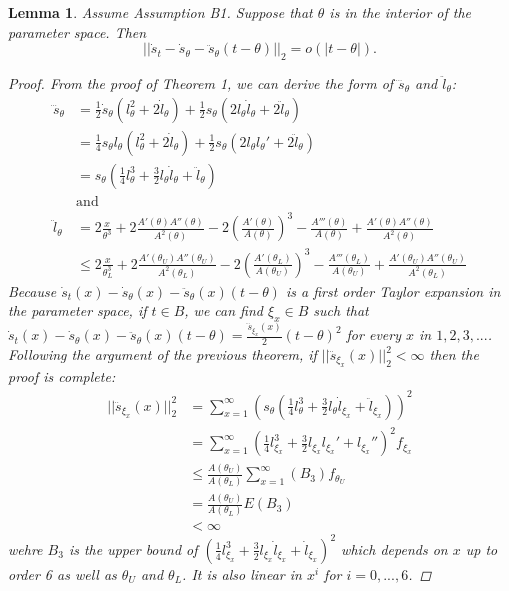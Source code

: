 \documentclass[11 pt]{article}
\newtheorem{lem}{Lemma}
\renewcommand{\th}{\theta}
\newcommand{\dddsth}{\dddot{s}_{\theta}}
\newcommand{\ddsth}{\ddot{s}_{\theta}}
\newcommand{\dsth}{\dot{s}_{\theta}}
\newcommand{\sth}{s_{\th}}
\newcommand{\lth}{l_{\th}}
\newcommand{\dlth}{\dot{l}_{\th}}
\newcommand{\ddlth}{\ddot{l}_{\th}}
\newcommand{\dddlth}{\dddot{l}_{\th}}
\begin{document}
\begin{lem}
\label{lem:l2diff2}
Assume Assumption B1. Suppose that $\th$ is in the interior of the parameter space. Then
\[
||\dot{s}_{t}  - \dsth - \ddsth(t-\th) ||_2 = o(|t - \th|).
\]
\begin{proof}
\newcommand{\dth}{\frac{d}{d \th}}
\newcommand{\ddth}{\frac{d^2}{d \th^2}}
\newcommand{\thl}{\theta_L}
\newcommand{\thu}{\theta_U}
\newcommand{\xix}{\xi_x}
\newcommand{\sxix}{s_{\xix}}
\newcommand{\lxix}{l_{\xix}}
\newcommand{\fxix}{f_{\xix}}
\newcommand{\dxix}{\frac{d}{d \xix}}

From the proof of Theorem 1, we can derive the form of $\dddsth$ and $\ddlth$:
\begin{align*}
\dddsth &= \frac{1}{2}\dsth(\lth^2 + 2 \dlth) + \frac{1}{2}\sth (2\lth \dlth + 2\ddlth) \\
&= \frac{1}{4} \sth \lth (\lth^2 + 2 \dlth) + \frac{1}{2}\sth ( 2 \lth \lth' + 2 \ddlth) \\
&=  \sth ( \frac{1}{4} \lth^3 + \frac{3}{2} \lth \dlth + \ddlth) \\
&\text{and} \\
\ddlth &= 2 \frac{x}{\th^3} + 2 \frac{A'(\th)A''(\th)}{A^2(\th)} - 2 \left ( \frac{A'(\th)}{A(\th)}\right )^3 - \frac{A'''(\th)}{A(\th)} + \frac{A'(\th)A''(\th)}{A^2(\th)} \\
&\leq 2 \frac{x}{\thl^3} + 2 \frac{A'(\thu)A''(\thu)}{A^2(\thl)} - 2 \left ( \frac{A'(\thl)}{A(\thu)}\right )^3 - \frac{A'''(\thl)}{A(\thu)} + \frac{A'(\thu)A''(\thu)}{A^2(\thl)}
\end{align*}
Because $\dot{s}_t(x) - \dsth(x) - \ddsth(x) (t - \th)$ is a first order Taylor expansion in the parameter space, if $t \in B$, we can find $\xi_x \in B$  such that $\dot{s}_t(x) - \dsth(x) - \ddsth(x) (t - \th) = \frac{\dddot{s}_{\xix}(x)}{2}(t - \th)^2$ for every $x$ in $1,2,3,...$. Following the argument of the previous theorem, if $||\dddot{s}_{\xix}(x)||_2^2 < \infty$ then the proof is complete:
\begin{align*}
||\dddot{s}_{\xix}(x)||_2^2 &= \sum_{x=1}^{\infty} (\sth ( \frac{1}{4} \lth^3 + \frac{3}{2} \lth \dot{l}_{\xix} + \ddot{l}_{\xix}))^2 \\
&=  \sum_{x=1}^{\infty} ( \frac{1}{4} \lxix^3 + \frac{3}{2} \lxix \lxix' + \lxix'')^2 \fxix \\
&\leq \frac{A(\thu)}{A(\thl)} \sum_{x=1}^{\infty} ( B_3 ) f_{\thu} \\
&= \frac{A(\thu)}{A(\thl)} E ( B_3 ) \\
&< \infty
\end{align*}
wehre $B_3$ is the upper bound of $ (\frac{1}{4} \lxix^3 + \frac{3}{2} \lxix \dot{l}_{\xix} + \dot{l}_{\xix})^2$ which depends on $x$ up to order 6 as well as $\thu$ and $\thl$. It is also linear in $x^i$ for $i=0,...,6$.
\end{proof}
\end{lem}
\end{document}
